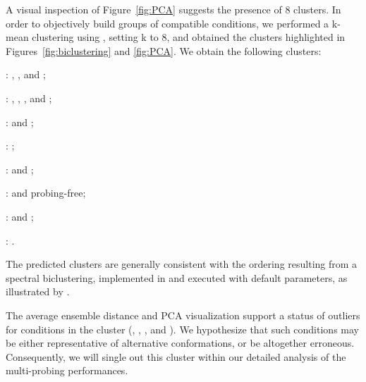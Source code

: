 \documentclass[a4,center,fleqn]{NAR}
\begin{document}
A visual inspection of Figure~\ref{fig:PCA} suggests the presence of 8 clusters. In order to objectively build groups of compatible conditions, we performed a k-mean clustering using , setting k to 8, and obtained the clusters highlighted in Figures~\ref{fig:biclustering} and \ref{fig:PCA}.  We obtain the following clusters:
\begin{bulletlist}%
\item {}: \OneMSevILU, \NMIA, and \NMIAMg;
\item {}: \OneMSevCE, \NMIACE, \BzCN, and \NAICE;
\item {}: \OneMSevILUThreeMg and \OneMSevILUMg;
\item {}: \OneMSevILUThree;
\item {}: \NMIAMgCE and \OneMSevMgCE;
\item {}: \DMSMg and probing-free;
\item {}: \CMCTMg and \NAIMg;
\item {}: \BzCNMg.
\end{bulletlist}
The predicted clusters are generally consistent with the ordering resulting from a spectral biclustering, implemented in  and executed with default parameters, as illustrated by . 

The average ensemble distance and PCA visualization support a status of outliers for conditions in the cluster  (\OneMSevCE, \NMIACE, \BzCN, and \NAICE).  We hypothesize that such conditions may be either representative of alternative conformations, or be altogether erroneous. Consequently, we will single out this cluster within our detailed analysis of the multi-probing performances.

\end{document}
